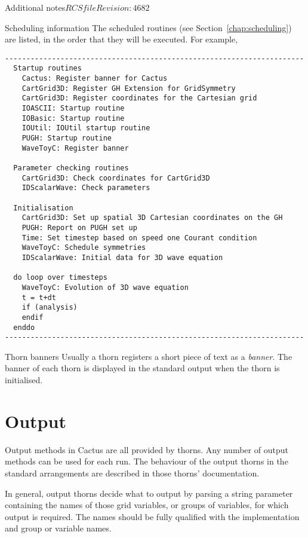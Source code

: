 \begin{cactuspart}{Additional notes}{$RCSfile$}{$Revision: 4682 $}
\begin{Lentry}
\item [Scheduling information]
        The scheduled routines (see Section~\ref{chap:scheduling})
are listed, in the order that they will be executed. For example,

\begin{verbatim}
----------------------------------------------------------------------
  Startup routines
    Cactus: Register banner for Cactus
    CartGrid3D: Register GH Extension for GridSymmetry
    CartGrid3D: Register coordinates for the Cartesian grid
    IOASCII: Startup routine
    IOBasic: Startup routine
    IOUtil: IOUtil startup routine
    PUGH: Startup routine
    WaveToyC: Register banner

  Parameter checking routines
    CartGrid3D: Check coordinates for CartGrid3D
    IDScalarWave: Check parameters

  Initialisation
    CartGrid3D: Set up spatial 3D Cartesian coordinates on the GH
    PUGH: Report on PUGH set up
    Time: Set timestep based on speed one Courant condition
    WaveToyC: Schedule symmetries
    IDScalarWave: Initial data for 3D wave equation

  do loop over timesteps
    WaveToyC: Evolution of 3D wave equation
    t = t+dt
    if (analysis)
    endif
  enddo
----------------------------------------------------------------------
\end{verbatim}

\item [Thorn banners]
        Usually a thorn registers a short piece of text as a \emph{banner}.
        The banner of each thorn is displayed in the standard output when
        the thorn is initialised.

\end{Lentry}


\section{Output}
Output methods in Cactus are all provided by thorns.
Any number of output methods can be used for each run.
The behaviour of the output thorns in the
standard arrangements are described in those thorns' documentation.

In general, output thorns decide what to output by parsing a string parameter
containing the names of those grid variables, or groups of variables, for which
output is required. The names should be fully qualified with the
implementation and group or variable names.


\end{cactuspart}
